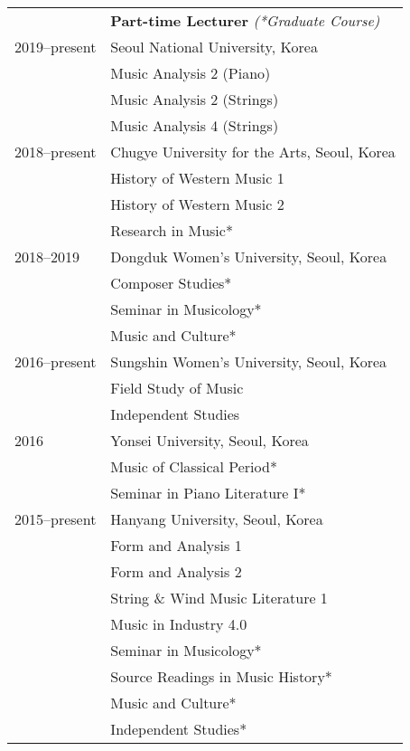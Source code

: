 \documentclass[a4paper,11pt]{article}
\begin{document}
  \hspace*{-0.25cm}
  \begin{tabular}{p{2.5cm} l}
    & \textbf{Part-time Lecturer} \textit{(*Graduate Course)}\\
    2019–present & Seoul National University, Korea\\
    & Music Analysis 2 (Piano)\\
    & Music Analysis 2 (Strings)\\
    & Music Analysis 4 (Strings)\\[1mm]
    
    2018–present & Chugye University for the Arts, Seoul, Korea\\
    & History of Western Music 1\\
    & History of Western Music 2\\
    & Research in Music*\\[1mm]
    
    2018–2019 & Dongduk Women's University, Seoul, Korea\\
    & Composer Studies*\\
    & Seminar in Musicology*\\
    & Music and Culture*\\[1mm]
    
    2016–present & Sungshin Women's University, Seoul, Korea\\
    & Field Study of Music\\
    & Independent Studies\\[1mm]
    
    2016 & Yonsei University, Seoul, Korea\\
    & Music of Classical Period*\\
    & Seminar in Piano Literature I*\\[1mm]
    
    2015–present & Hanyang University, Seoul, Korea\\
    & Form and Analysis 1\\
    & Form and Analysis 2\\
    & String \& Wind Music Literature 1\\
    & Music in Industry 4.0\\
    & Seminar in Musicology*\\
    & Source Readings in Music History*\\
    & Music and Culture*\\
    & Independent Studies*\\[1mm]
    

\end{tabular}
\end{document}
